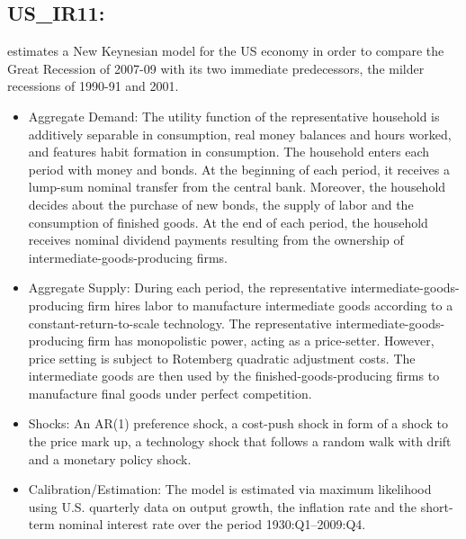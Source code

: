 \documentclass[11pt,a4paper]{article}
\begin{document}
	
	\subsection{US\_IR11: \cite{Ireland2011}}
	\label{USIR11}
	\cite{Ireland2011} estimates a New Keynesian model for the US economy in order to compare the Great Recession of 2007-09 with its two immediate predecessors, the milder recessions of 1990-91 and 2001.
	
	\begin{itemize}
		\item Aggregate Demand:  The utility function of the representative household is additively separable in consumption, real money balances and hours worked, and features habit formation in consumption. The household enters each period with money and bonds. At the beginning of each period, it receives a lump-sum nominal transfer from the central bank. Moreover, the household decides about the purchase of new bonds, the supply of labor and the consumption of finished goods. At the end of each period, the household receives nominal dividend payments resulting from the ownership of intermediate-goods-producing firms.
		
		\item Aggregate Supply: During each period, the representative intermediate-goods-producing firm hires labor to manufacture intermediate goods according to a constant-return-to-scale technology.  The representative intermediate-goods-producing firm has monopolistic power, acting as a price-setter. However, price setting is subject to Rotemberg quadratic adjustment costs. The intermediate goods are then used by the finished-goods-producing firms to manufacture final goods under perfect competition.
		
		\item Shocks: An AR(1) preference shock, a cost-push shock in form of a shock to the price mark up, a technology shock that follows a random walk with drift and a monetary policy shock.
		
		\item Calibration/Estimation: The model is estimated via maximum likelihood using U.S. quarterly data on output growth, the inflation rate and the short-term nominal interest rate over the period 1930:Q1--2009:Q4.
		
		
	\end{itemize}
	
\end{document}
